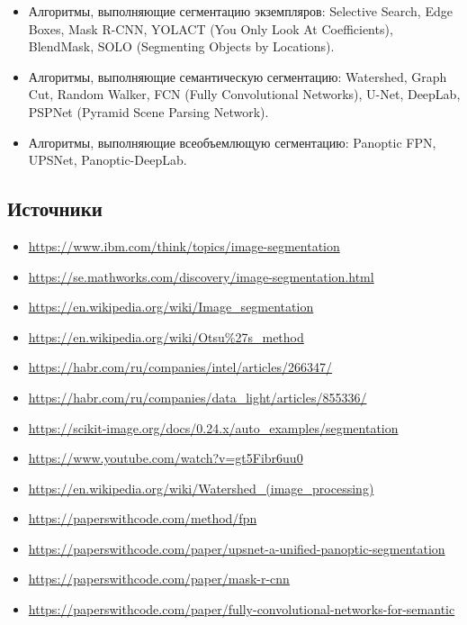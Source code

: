 \begin{itemize}
    \item Алгоритмы, выполняющие сегментацию экземпляров: Selective Search, Edge Boxes, Mask R-CNN, YOLACT (You Only Look At Coefficients), BlendMask, SOLO (Segmenting Objects by Locations).
    \item Алгоритмы, выполняющие семантическую сегментацию: Watershed, Graph Cut, Random Walker, FCN (Fully Convolutional Networks), U-Net, DeepLab, PSPNet (Pyramid Scene Parsing Network).
    \item Алгоритмы, выполняющие всеобъемлющую сегментацию: Panoptic FPN, UPSNet, Panoptic-DeepLab.
\end{itemize}

\subsection{Источники}

\begin{itemize}
    \item \url{https://www.ibm.com/think/topics/image-segmentation}
    \item \url{https://se.mathworks.com/discovery/image-segmentation.html}
    \item \url{https://en.wikipedia.org/wiki/Image_segmentation}
    \item \url{https://en.wikipedia.org/wiki/Otsu%27s_method}
    \item \url{https://habr.com/ru/companies/intel/articles/266347/}
    \item \url{https://habr.com/ru/companies/data_light/articles/855336/}
    \item \url{https://scikit-image.org/docs/0.24.x/auto_examples/segmentation}
    \item \url{https://www.youtube.com/watch?v=gt5Fibr6uu0}
    \item \url{https://en.wikipedia.org/wiki/Watershed_(image_processing)}
    \item \url{https://paperswithcode.com/method/fpn}
    \item \url{https://paperswithcode.com/paper/upsnet-a-unified-panoptic-segmentation}
    \item \url{https://paperswithcode.com/paper/mask-r-cnn}
    \item \url{https://paperswithcode.com/paper/fully-convolutional-networks-for-semantic}
\end{itemize}
